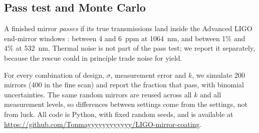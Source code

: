 \subsection{Pass test and Monte Carlo}

A finished mirror \emph{passes} if its true transmissions land inside
the Advanced LIGO end-mirror windows \cite{E0900068}: between 4 and
6~ppm at 1064~nm, and between 1\% and 4\% at 532~nm. Thermal noise is
not part of the pass test; we report it separately, because the rescue
could in principle trade noise for yield.

For every combination of design, $\sigma$, measurement error and $k$,
we simulate 200 mirrors (400 in the fine scan) and report the fraction
that pass, with binomial uncertainties. The same random mirrors are
reused across all $k$ and all measurement levels, so differences
between settings come from the settings, not from luck. All code is
Python, with fixed random seeds, and is available at
\url{https://github.com/Tonmayyyyyyyyyyyy/LIGO-mirror-coating}.

